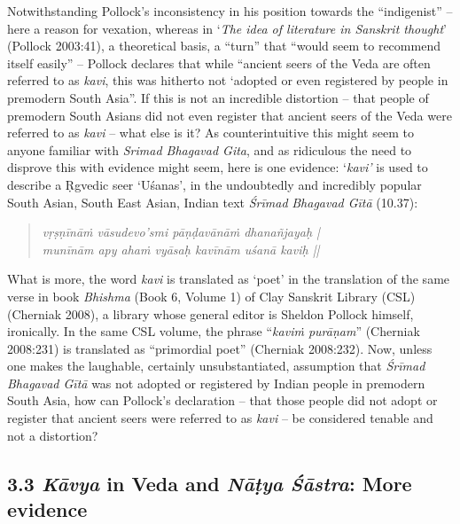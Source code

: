 Notwithstanding Pollock’s inconsistency in his position towards the “indigenist” – here a reason for vexation, whereas in ‘\textit{The idea of literature in Sanskrit thought}’ (Pollock 2003:41), a theoretical basis, a “turn” that “would seem to recommend itself easily” – Pollock declares that while “ancient seers of the Veda are often referred to as \textit{kavi}, this was hitherto not ‘adopted or even registered by people in premodern South Asia”. If this is not an incredible distortion – that people of premodern South Asians did not even register that ancient seers of the Veda were referred to as \textit{kavi} – what else is it? As counterintuitive this might seem to anyone familiar with \textit{Srimad Bhagavad Gita}, and as ridiculous the need to disprove this with evidence might seem, here is one evidence: ‘\textit{kavi’} is used to describe a Ṛgvedic seer ‘Uśanas’, in the undoubtedly and incredibly popular South Asian, South East Asian, Indian text \textit{Śrīmad} \textit{Bhagavad Gītā} (10.37):

\begin{verse}
\textit{vṛṣṇīnāṁ vāsudevo’smi pāṇḍavānāṁ dhanañjayaḥ |}\\\textit{munīnām apy ahaṁ vyāsaḥ kavīnām uśanā kaviḥ ||}
\end{verse}

What is more, the word \textit{kavi} is translated as ‘poet’ in the translation of the same verse in book \textit{Bhishma} (Book 6, Volume 1) of Clay Sanskrit Library (CSL) (Cherniak 2008), a library whose general editor is Sheldon Pollock himself, ironically. In the same CSL volume, the phrase “\textit{kaviṁ purāṇam}” (Cherniak 2008:231) is translated as “primordial poet” (Cherniak 2008:232). Now, unless one makes the laughable, certainly unsubstantiated, assumption that \textit{Śrīmad} \textit{Bhagavad Gītā} was not adopted or registered by Indian people in premodern South Asia, how can Pollock’s declaration – that those people did not adopt or register that ancient seers were referred to as \textit{kavi} – be considered tenable and not a distortion?


\subsection*{3.3 \textit{Kāvya} in Veda and \textit{Nāṭya Śāstra}: More evidence}

